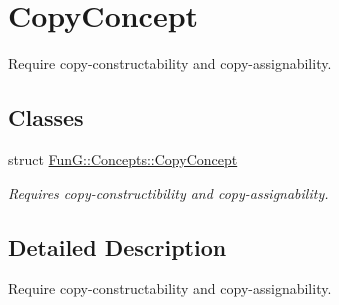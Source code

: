\hypertarget{group__CopyConcept}{}\section{Copy\+Concept}
\label{group__CopyConcept}


Require copy-\/constructability and copy-\/assignability.  


\subsection*{Classes}
\begin{DoxyCompactItemize}
\item 
struct \hyperlink{structFunG_1_1Concepts_1_1CopyConcept}{Fun\+G\+::\+Concepts\+::\+Copy\+Concept}
\begin{DoxyCompactList}\small\item\em Requires copy-\/constructibility and copy-\/assignability. \end{DoxyCompactList}\end{DoxyCompactItemize}


\subsection{Detailed Description}
Require copy-\/constructability and copy-\/assignability. 

